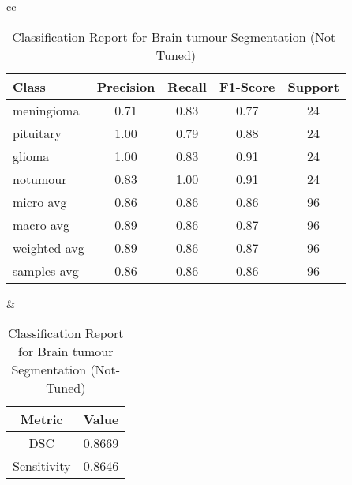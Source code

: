   \begin{table}[ht]
  \centering
  \begin{tabular}{cc}
      \begin{minipage}{.6\linewidth}
          \centering
          \begin{subtable}[t]{\linewidth}
              \centering
              \begin{tabular}{|l|c|c|c|c|}
                  \hline 
                  \textbf{Class} & \textbf{Precision} & \textbf{Recall} & \textbf{F1-Score} & \textbf{Support} \\ 
                  \hline 
                  meningioma & 0.71 & 0.83 & 0.77 & 24 \\ 
                  \hline
                  pituitary  & 1.00 & 0.79 & 0.88 & 24 \\ 
                  \hline
                  glioma     & 1.00 & 0.83 & 0.91 & 24 \\ 
                  \hline
                  notumour    & 0.83 & 1.00 & 0.91 & 24 \\ 
                  \hline
                  micro avg  & 0.86 & 0.86 & 0.86 & 96 \\ 
                  \hline
                  macro avg  & 0.89 & 0.86 & 0.87 & 96 \\ 
                  \hline
                  weighted avg & 0.89 & 0.86 & 0.87 & 96 \\ 
                  \hline
                  samples avg & 0.86 & 0.86 & 0.86 & 96 \\ 
                  \hline
              \end{tabular}
              \caption{Classification Report for Brain tumour Segmentation (Not-Tuned)} 
              \label{tab:xception_nt_classification_report}
          \end{subtable}
      \end{minipage} &
      \begin{minipage}{.35\linewidth}
          \centering
          \begin{subtable}[t]{\linewidth}
              \centering
              \begin{tabular}{|c|c|}
                  \hline 
                  \textbf{Metric} & \textbf{Value} \\ 
                  \hline
                  DSC & 0.8669 \\ 
                  \hline
                  Sensitivity & 0.8646 \\ 
                  \hline

\end{tabular}
\end{subtable}
\end{minipage}
\end{tabular}
\end{table}
